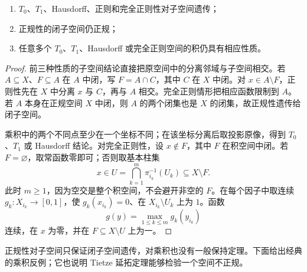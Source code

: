 \begin{proposition}[分离性质的基本稳定性]
\label{prop:separation-heredity-products}
\begin{enumerate}[label=\textup{(\roman*)}]
 \item \(T_0\)、\(T_1\)、Hausdorff、正则和完全正则性对子空间遗传；
 \item 正规性的闭子空间仍正规；
 \item 任意多个 \(T_0\)、\(T_1\)、Hausdorff 或完全正则空间的积仍具有相应性质。
\end{enumerate}
\end{proposition}

\begin{proof}
前三种性质的子空间结论直接把原空间中的分离邻域与子空间相交。若 \(A\subseteq X\)、\(F\subseteq A\) 在 \(A\) 中闭，写 \(F=A\cap C\)，其中 \(C\) 在 \(X\) 中闭。对 \(x\in A\setminus F\)，正则性先在 \(X\) 中分离 \(x\) 与 \(C\)，再与 \(A\) 相交。完全正则情形把相应函数限制到 \(A\)。若 \(A\) 本身在正规空间 \(X\) 中闭，则 \(A\) 的两个闭集也是 \(X\) 的闭集，故正规性遗传给闭子空间。

乘积中的两个不同点至少在一个坐标不同；在该坐标分离后取投影原像，得到 \(T_0\)、\(T_1\) 或 Hausdorff 结论。对完全正则性，设 \(x\notin F\)，其中 \(F\) 在积空间中闭。若 \(F=\varnothing\)，取常函数零即可；否则取基本柱集
\[
 x\in U=\bigcap_{k=1}^m\pi_{i_k}^{-1}(U_k)
 \subseteq X\setminus F.
\]
此时 \(m\ge1\)，因为空交是整个积空间，不会避开非空的 \(F\)。在每个因子中取连续 \(g_k:X_{i_k}\to[0,1]\)，使 \(g_k(x_{i_k})=0\)、在 \(X_{i_k}\setminus U_k\) 上为 \(1\)。函数
\[
 g(y)=\max_{1\le k\le m}g_k(y_{i_k})
\]
连续，在 \(x\) 为零，并在 \(F\subseteq X\setminus U\) 上为一。
\end{proof}

正规性对子空间只保证闭子空间遗传，对乘积也没有一般保持定理。下面给出经典的乘积反例；它也说明 Tietze 延拓定理能够检验一个空间不正规。

